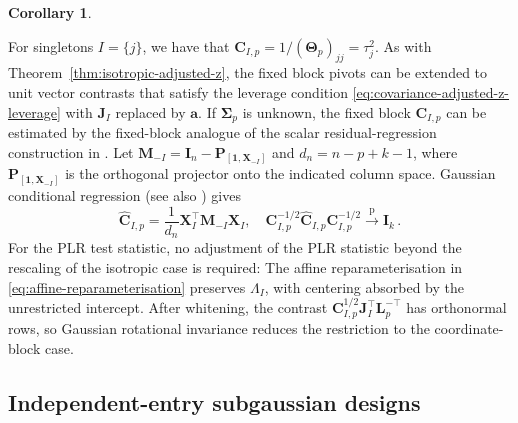 \documentclass{article}
\newtheorem{corollary}[theorem]{Corollary}
\theoremstyle{definition}
\newcommand*{\bb}{\boldsymbol}
\def\bX{\bb{X}}
\def\bmu{\bb{\mu}}
\def\bSigma{\bb{\Sigma}}
\def\bTheta{\bb{\Theta}}
\def\bbeta{\bb{\beta}}
\begin{document}
\begin{bibunit}
\begin{corollary}
\end{corollary}
\noindent
For singletons $I=\{j\}$, we have that 
$\bb C_{I,p}=1/(\bTheta_p)_{jj}=\tau_j^2$. As with Theorem~\ref{thm:isotropic-adjusted-z}, the fixed block pivots 
can be extended to unit vector contrasts that satisfy the leverage condition \eqref{eq:covariance-adjusted-z-leverage} with $\bb J_I$ replaced by $\bb a$. 
If $\bSigma_p$ is unknown, the fixed block $\bb C_{I,p}$ can be estimated by
the fixed-block analogue of the scalar residual-regression construction in
\citet[Section~5.1, eq.~(5.1)]{zhao+etal:2022}. Let
$\bb M_{-I}=\bb I_n-\bb P_{[\bb 1,\bX_{-I}]}$ and $d_n=n-p+k-1$, where
$\bb P_{[\bb 1,\bX_{-I}]}$ is the orthogonal projector onto the indicated
column space. Gaussian conditional regression (see also \citealt[Section~5.1, eq.~(5.1)]{zhao+etal:2022}) gives
$$
\widehat{\bb C}_{I,p}
=
\frac{1}{d_n}
\bX_I^\top\bb M_{-I}\bX_I,
\quad
\bb C_{I,p}^{-1/2}
\widehat{\bb C}_{I,p}
\bb C_{I,p}^{-1/2}
\overset{\mathrm p}{\longrightarrow}
\bb I_k\,.
$$
For the PLR test statistic, no
adjustment of the PLR statistic beyond the rescaling of the isotropic
case is required: The affine reparameterisation in \eqref{eq:affine-reparameterisation}
preserves $\Lambda_I$, with centering absorbed by the unrestricted
intercept. After whitening, the contrast
$\bb C_{I,p}^{1/2}\bb J_I^\top\bb L_p^{-\top}$ has orthonormal rows,
so Gaussian rotational invariance reduces the restriction to the
coordinate-block case. 

\subsection{Independent-entry subgaussian designs}
\label{sec:extensions-subgaussian}


\end{bibunit}
\end{document}
